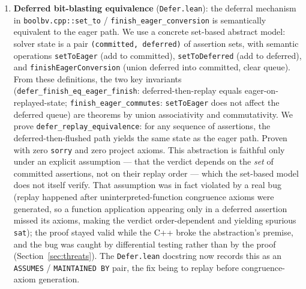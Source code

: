 \documentclass[runningheads]{llncs}
\begin{document}
\begin{enumerate}
\begin{itemize}
    \texttt{eq\_zero\_or\_one\_of\_sq\_eq\_self} to non-domains.
  \item \texttt{isLocalRing\_ZMod\_prime\_pow}:
    $\mathbb{Z}_{p^n}$ is a local ring for prime $p$, $n \geq 1$.
    Mathlib contribution candidate.
  \end{itemize}
  Mechanised concretely: \texttt{strongGB} is defined as the
  identity function (the trivially-sound abstraction; the C++
  implementation typically returns a strict superset, but the
  abstract contract used elsewhere in the file is just ideal
  preservation), and \texttt{strongGB\_ideal\_preserved} is then
  proved by \texttt{rfl}. The negative results
  (\texttt{naive\_completeness\_is\_false},
  \texttt{two\_trick\_saturation\_complete\_is\_false},
  \texttt{d\_eq\_one\_completeness}) hold for any function
  satisfying the ideal-preservation contract, so this
  mechanisation does not weaken them. The Song et
  al.~\cite{song2024equational} completeness theorem holds for
  a specific class of polynomial systems (those arising from a
  faithful BV-formula encoding, beyond just idempotency); its
  full mechanisation would require defining the encoding
  formally and is not required by the implementation, which
  intentionally permits \texttt{UNKNOWN}.

\item \textbf{Deferred bit-blasting equivalence}
  (\texttt{Defer.lean}): the deferral mechanism in
  \texttt{boolbv.cpp::set\_to} / \texttt{finish\_eager\_conversion}
  is semantically equivalent to the eager path. We use a
  concrete set-based abstract model: solver state is a pair
  \texttt{(committed, deferred)} of assertion sets, with
  semantic operations \texttt{setToEager} (add to committed),
  \texttt{setToDeferred} (add to deferred), and
  \texttt{finishEagerConversion} (union deferred into committed,
  clear queue). From these definitions, the two key invariants
  (\texttt{defer\_finish\_eq\_eager\_finish}: deferred-then-replay
  equals eager-on-replayed-state;
  \texttt{finish\_eager\_commutes}: \texttt{setToEager} does
  not affect the deferred queue) are theorems by union
  associativity and commutativity. We prove
  \texttt{defer\_replay\_equivalence}: for any sequence of
  assertions, the deferred-then-flushed path yields the same
  state as the eager path. Proven with zero \texttt{sorry} and
  zero project axioms. This abstraction is faithful only under an
  explicit assumption --- that the verdict depends on the
  \emph{set} of committed assertions, not on their replay order
  --- which the set-based model does not itself verify. That
  assumption was in fact violated by a real bug (replay happened
  after uninterpreted-function congruence axioms were generated,
  so a function application appearing only in a deferred assertion
  missed its axioms, making the verdict order-dependent and
  yielding spurious \texttt{sat}); the proof stayed valid while
  the C++ broke the abstraction's premise, and the bug was caught
  by differential testing rather than by the proof
  (Section~\ref{sec:threats}). The
  \texttt{Defer.lean} docstring now records this as an
  \texttt{ASSUMES} / \texttt{MAINTAINED BY} pair, the fix being to
  replay before congruence-axiom generation.


\end{enumerate}
\end{document}
